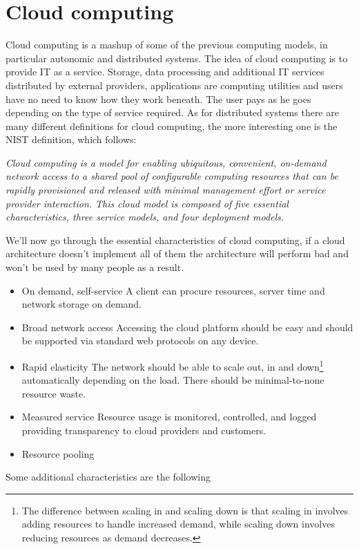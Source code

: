 \section{Cloud computing}
Cloud computing is a mashup of some of the previous computing models, in particular autonomic and distributed systems. \n
The idea of cloud computing is to provide IT as a service. Storage, data processing and additional IT services distributed by external providers, applications are computing utilities and users have no need to know how they work beneath. The user pays as he goes depending on the type of service required. \n
As for distributed systems there are many different definitions for cloud computing, the more interesting one is the NIST definition, which follows:
\begin{center}
    \textit{Cloud computing is a model for enabling ubiquitous, convenient, on-demand network access to a shared pool of configurable computing resources that can be rapidly provisioned and released with minimal management effort or service provider interaction. This cloud model is composed of five essential characteristics, three service models, and four deployment models.}
\end{center}
We'll now go through the essential characteristics of cloud computing, if a cloud architecture doesn't implement all of them the architecture will perform bad and won't be used by many people as a result.
\begin{itemize}
    \item On demand, self-service \n
    A client can procure resources, server time and network storage on demand.
    \item Broad network access \n
    Accessing the cloud platform should be easy and should be supported via standard web protocols on any device.
    \item Rapid elasticity \n
    The network should be able to scale out, in and down\footnote{
        The difference between scaling in and scaling down is that scaling in involves adding resources to handle increased demand, while scaling down involves reducing resources as demand decreases.
    } automatically depending on the load. There should be minimal-to-none resource waste.
    \item Measured service \n
    Resource usage is monitored, controlled, and logged providing transparency to cloud providers and customers.
    \item Resource pooling
\end{itemize}
Some additional characteristics are the following
